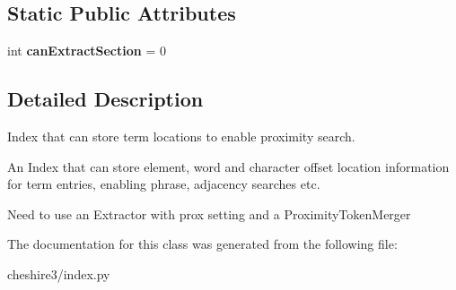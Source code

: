 \subsection*{Static Public Attributes}
\begin{DoxyCompactItemize}
\item 
\hypertarget{classcheshire3_1_1index_1_1_proximity_index_a3049a30fa9225b035b9b5e990ac74b60}{int {\bfseries can\-Extract\-Section} = 0}\label{classcheshire3_1_1index_1_1_proximity_index_a3049a30fa9225b035b9b5e990ac74b60}

\end{DoxyCompactItemize}


\subsection{Detailed Description}
\begin{DoxyVerb}Index that can store term locations to enable proximity search.

An Index that can store element, word and character offset location
information for term entries, enabling phrase, adjacency searches etc.

Need to use an Extractor with prox setting and a ProximityTokenMerger
\end{DoxyVerb}
 

The documentation for this class was generated from the following file\-:\begin{DoxyCompactItemize}
\item 
cheshire3/index.\-py\end{DoxyCompactItemize}
